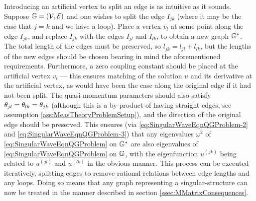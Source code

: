 Introducing an artificial vertex to split an edge is as intuitive as it sounds.
Suppose $\mathbb{G}=\left( \mathcal{V}, \mathcal{E} \right)$ and one wishes to split the edge $I_{jk}$ (where it may be the case that $j=k$ and we have a loop).
Place a vertex $v_l$ at some point along the edge $I_{jk}$, and replace $I_{jk}$ with the edges $I_{jl}$ and $I_{lk}$, to obtain a new graph $\mathbb{G}^*$.
The total length of the edges must be preserved, so $l_{jk} = l_{jl} + l_{lk}$, but the lengths of the new edges should be chosen bearing in mind the aforementioned requirements.
Furthermore, a zero coupling constant should be placed at the artificial vertex $v_l$ --- this ensures matching of the solution $u$ and its derivative at the artificial vertex, as would have been the case along the original edge if it had not been split.
The quasi-momentum parameters should also satisfy $\theta_{jl}=\theta_{lk}=\theta_{jk}$ (although this is a by-product of having straight edges, see assumption \ref{ass:MeasTheoryProblemSetup}), and the direction of the original edge should be preserved.
This ensures (via \eqref{eq:SingularWaveEqnQGProblem-2} and \eqref{eq:SingularWaveEqnQGProblem-3}) that any eigenvalues $\omega^2$ of \eqref{eq:SingularWaveEqnQGProblem} on $\mathbb{G}^*$ are also eigenvalues of \eqref{eq:SingularWaveEqnQGProblem} on $\mathbb{G}$, with the eigenfunction $u^{(jk)}$ being related to $u^{(jl)}$ and $u^{(lk)}$ in the obvious manner.
This process can be executed iteratively, splitting edges to remove rational-relations between edge lengths and any loops.
Doing so means that any graph representing a singular-structure can now be treated in the manner described in section \ref{ssec:MMatrixConsequences}.

